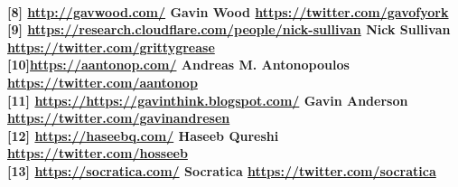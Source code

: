 \documentclass{article}
\begin{document}
\\
\textbf{[8] \url {http://gavwood.com/} Gavin Wood \quad
\url {https://twitter.com/gavofyork} }
\\
\textbf{[9] \url{https://research.cloudflare.com/people/nick-sullivan}
Nick Sullivan \quad \url{https://twitter.com/grittygrease}}
\\
\textbf{[10]\url {https://aantonop.com/} Andreas M. Antonopoulos \quad 
\url{https://twitter.com/aantonop}}
\\
\textbf{[11] \url{https://https://gavinthink.blogspot.com/} Gavin Anderson \quad \url{https://twitter.com/gavinandresen}}
\\
\textbf{[12] \url{https://haseebq.com/} Haseeb Qureshi \quad \url{https://twitter.com/hosseeb}}
\\
\textbf{[13] \url{https://socratica.com/} Socratica \quad \url{https://twitter.com/socratica}}

\pagebreak

\pagebreak
\end{document}
